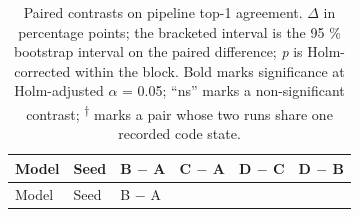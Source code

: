 \begin{landscape}
\begingroup\scriptsize\setlength{\tabcolsep}{3pt}\sloppy
\begin{longtable}[]{@{}
  >{\raggedright\arraybackslash}p{}
  >{\raggedleft\arraybackslash}p{}
  >{\raggedright\arraybackslash}p{}
  >{\raggedright\arraybackslash}p{}
  >{\raggedright\arraybackslash}p{}
  >{\raggedright\arraybackslash}p{}@{}}
\caption{Paired contrasts on pipeline top-1 agreement. \(\Delta\) in percentage points; the bracketed interval is the 95 \% bootstrap interval on the paired difference; \emph{p} is Holm-corrected within the block. Bold marks significance at Holm-adjusted \(\alpha\) = 0.05; ``ns'' marks a non-significant contrast; \textsuperscript{\ensuremath{\dagger}} marks a pair whose two runs share one recorded code state.}\tabularnewline
\toprule\noalign{}
\begin{minipage}[b]{\linewidth}\raggedright
Model
\end{minipage} & \begin{minipage}[b]{\linewidth}\raggedleft
Seed
\end{minipage} & \begin{minipage}[b]{\linewidth}\raggedright
B \ensuremath{-} A
\end{minipage} & \begin{minipage}[b]{\linewidth}\raggedright
C \ensuremath{-} A
\end{minipage} & \begin{minipage}[b]{\linewidth}\raggedright
D \ensuremath{-} C
\end{minipage} & \begin{minipage}[b]{\linewidth}\raggedright
D \ensuremath{-} B
\end{minipage} \\
\midrule\noalign{}
\endfirsthead
\toprule\noalign{}
\begin{minipage}[b]{\linewidth}\raggedright
Model
\end{minipage} & \begin{minipage}[b]{\linewidth}\raggedleft
Seed
\end{minipage} & \begin{minipage}[b]{\linewidth}\raggedright
B \ensuremath{-} A
\end{minipage} & \begin{minipage}[b]{\linewidth}\raggedright

\end{minipage}
\end{longtable}
\end{landscape}
